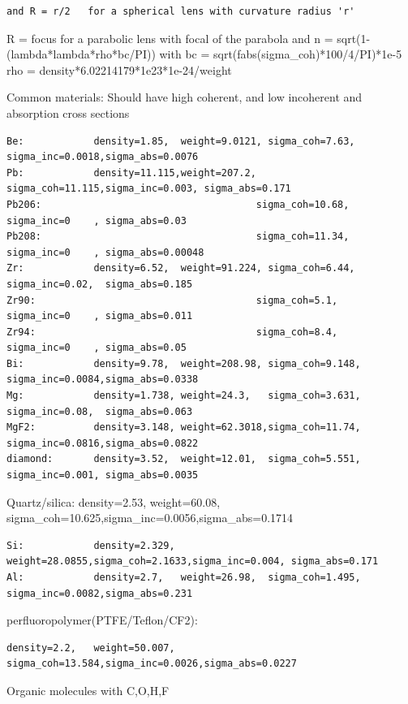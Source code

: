 \begin{verbatim}
and R = r/2   for a spherical lens with curvature radius 'r'
\end{verbatim}

R = focus for a parabolic lens with focal of the parabola and n = sqrt(1-(lambda*lambda*rho*bc/PI)) with bc = sqrt(fabs(sigma\_coh)*100/4/PI)*1e-5 rho = density*6.02214179*1e23*1e-24/weight

Common materials: Should have high coherent, and low incoherent and absorption cross sections

\begin{verbatim}
Be:            density=1.85,  weight=9.0121, sigma_coh=7.63,  sigma_inc=0.0018,sigma_abs=0.0076
Pb:            density=11.115,weight=207.2,  sigma_coh=11.115,sigma_inc=0.003, sigma_abs=0.171
Pb206:                                     sigma_coh=10.68, sigma_inc=0    , sigma_abs=0.03
Pb208:                                     sigma_coh=11.34, sigma_inc=0    , sigma_abs=0.00048
Zr:            density=6.52,  weight=91.224, sigma_coh=6.44,  sigma_inc=0.02,  sigma_abs=0.185
Zr90:                                      sigma_coh=5.1,   sigma_inc=0    , sigma_abs=0.011
Zr94:                                      sigma_coh=8.4,   sigma_inc=0    , sigma_abs=0.05
Bi:            density=9.78,  weight=208.98, sigma_coh=9.148, sigma_inc=0.0084,sigma_abs=0.0338
Mg:            density=1.738, weight=24.3,   sigma_coh=3.631, sigma_inc=0.08,  sigma_abs=0.063
MgF2:          density=3.148, weight=62.3018,sigma_coh=11.74, sigma_inc=0.0816,sigma_abs=0.0822
diamond:       density=3.52,  weight=12.01,  sigma_coh=5.551, sigma_inc=0.001, sigma_abs=0.0035
\end{verbatim}

Quartz/silica: density=2.53, weight=60.08, sigma\_coh=10.625,sigma\_inc=0.0056,sigma\_abs=0.1714

\begin{verbatim}
Si:            density=2.329, weight=28.0855,sigma_coh=2.1633,sigma_inc=0.004, sigma_abs=0.171
Al:            density=2.7,   weight=26.98,  sigma_coh=1.495, sigma_inc=0.0082,sigma_abs=0.231
\end{verbatim}

perfluoropolymer(PTFE/Teflon/CF2):

\begin{verbatim}
density=2.2,   weight=50.007, sigma_coh=13.584,sigma_inc=0.0026,sigma_abs=0.0227
\end{verbatim}

Organic molecules with C,O,H,F

